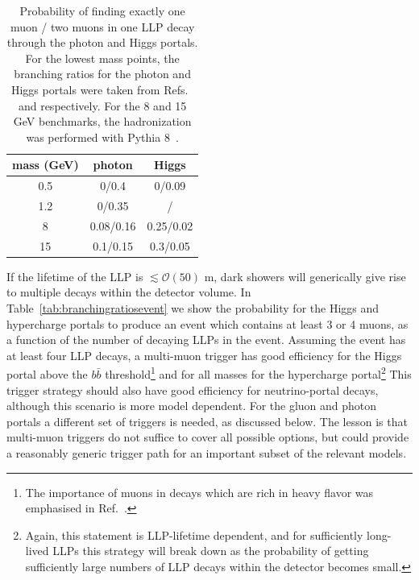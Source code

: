 \begin{enumerate}
\begin{table}[t]\centering
\begin{tabular}{|c|cc|}\hline
mass (GeV)  &photon &Higgs  \\\hline
0.5&0/0.4&0/0.09\\
1.2&0/0.35&/\\
8&0.08/0.16&0.25/0.02\\
15&0.1/0.15&0.3/0.05\\\hline
\end{tabular}
\caption{Probability of finding exactly one muon / two muons in one LLP decay through the photon and Higgs portals. For the lowest mass points, the branching ratios for the photon and Higgs portals were taken from Refs.~\cite{Meade:2009rb} and \cite{Fradette:2017sdd} respectively. For the 8 and 15 GeV benchmarks, the hadronization was performed with Pythia 8~\cite{Sjostrand:2006za,Sjostrand:2007gs}.\label{tab:branchingratios}}
\end{table}


If the lifetime of the LLP is $\lesssim \mathcal{O}(50)$ m, dark showers will generically give rise to multiple decays within the detector volume.  In Table~\ref{tab:branchingratiosevent} we show the probability for the Higgs and hypercharge portals to produce an event which contains at least 3 or 4 muons, as a function of the number of decaying LLPs in the event. Assuming the event has at least four LLP decays, a multi-muon trigger has good efficiency for the Higgs portal above the $b\bar b$ threshold\footnote{The importance of muons in decays which are rich in heavy flavor was emphasised in Ref.~\cite{Strassler:2008fv}.} and for all masses for the hypercharge portal\footnote{Again, this statement is LLP-lifetime dependent, and for sufficiently long-lived LLPs this strategy will break down as the probability of getting sufficiently large numbers of LLP decays within the detector becomes small.} This trigger strategy should also have good efficiency for  neutrino-portal decays, although this scenario is more model dependent. For the gluon and photon portals a different set of triggers is needed, as discussed below. The lesson is that multi-muon triggers do not suffice to cover all possible options, but could provide a reasonably generic trigger path for an important subset of the relevant models.




\end{enumerate}
